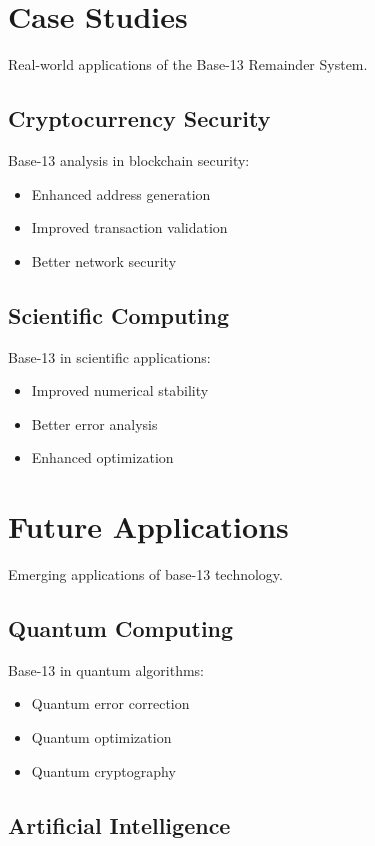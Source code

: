 \documentclass[12pt,a4paper]{report}
\begin{document}
\section{Case Studies}

Real-world applications of the Base-13 Remainder System.

\subsection{Cryptocurrency Security}

Base-13 analysis in blockchain security:
\begin{itemize}
\item Enhanced address generation
\item Improved transaction validation
\item Better network security
\end{itemize}

\subsection{Scientific Computing}

Base-13 in scientific applications:
\begin{itemize}
\item Improved numerical stability
\item Better error analysis
\item Enhanced optimization
\end{itemize}

\section{Future Applications}

Emerging applications of base-13 technology.

\subsection{Quantum Computing}

Base-13 in quantum algorithms:
\begin{itemize}
\item Quantum error correction
\item Quantum optimization
\item Quantum cryptography
\end{itemize}

\subsection{Artificial Intelligence}
\end{document}
